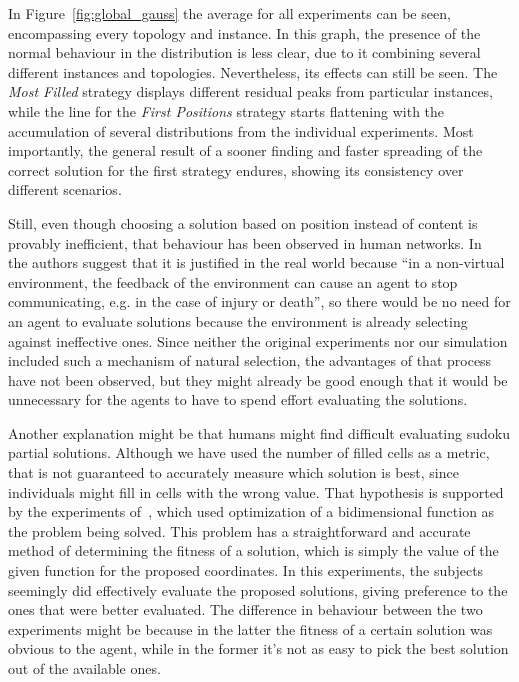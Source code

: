 \documentclass{article}
\begin{document}
In Figure~\ref{fig:global_gauss} the average for all experiments can be seen, encompassing every topology and instance. In this graph, the presence of the normal behaviour in the distribution is less clear, due to it combining several different instances and topologies. Nevertheless, its effects can still be seen. The \emph{Most Filled} strategy displays different residual peaks from particular instances, while the line for the \emph{First Positions} strategy starts flattening with the accumulation of several distributions from the individual experiments. Most importantly, the general result of a sooner finding and faster spreading of the correct solution for the first strategy endures, showing its consistency over different scenarios.

Still, even though choosing a solution based on position instead of content is provably inefficient, that behaviour has been observed in human networks. In~\cite{farenzena:collabem} the authors suggest that it is justified in the real world because ``in a non-virtual environment, the feedback of the environment can cause an agent to stop communicating, e.g. in the case of injury or death'', so there would be no need for an agent to evaluate solutions because the environment is already selecting against ineffective ones. Since neither the original experiments nor our simulation included such a mechanism of natural selection, the advantages of that process have not been observed, but they might already be good enough that it would be unnecessary for the agents to have to spend effort evaluating the solutions.

Another explanation might be that humans might find difficult evaluating sudoku partial solutions. Although we have used the number of filled cells as a metric, that is not guaranteed to accurately measure which solution is best, since individuals might fill in cells with the wrong value. That hypothesis is supported by the experiments of~\cite{mason:collablearnet}, which used optimization of a bidimensional function as the problem being solved. This problem has a straightforward and accurate method of determining the fitness of a solution, which is simply the value of the given function for the proposed coordinates. In this experiments, the subjects seemingly did effectively evaluate the proposed solutions, giving preference to the ones that were better evaluated. The difference in behaviour between the two experiments might be because in the latter the fitness of a certain solution was obvious to the agent, while in the former it's not as easy to pick the best solution out of the available ones.
\end{document}
